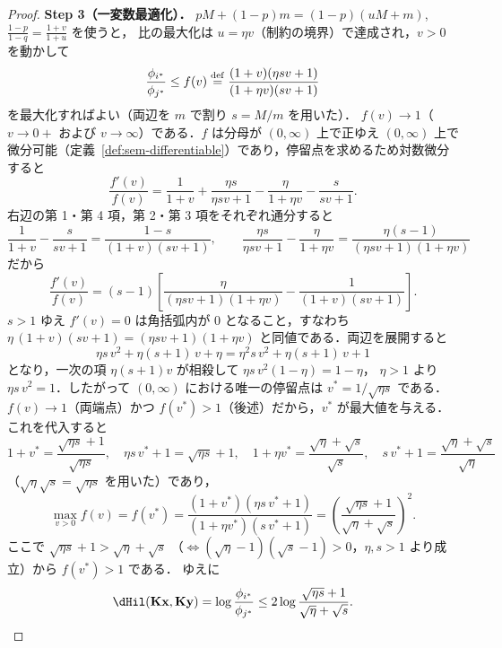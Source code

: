 \begin{proof}
  \textbf{Step 3（一変数最適化）．}
  $p M + (1-p)m = (1-p)(uM + m)$, $\frac{1-p}{1-q} = \frac{1+v}{1+u}$ を使うと，
  比の最大化は $u = \eta v$（制約の境界）で達成され，$v > 0$ を動かして
  \[
    \frac{\phi_{i^*}}{\phi_{j^*}}
    \leq f(v) \overset{\mathrm{def}}{=} \frac{(1+v)(\eta s v + 1)}{(1+\eta v)(s v + 1)}
  \]
  を最大化すればよい（両辺を $m$ で割り $s = M/m$ を用いた）．
  $f(v) \to 1$（$v \to 0+$ および $v \to \infty$）である．$f$ は分母が $(0,\infty)$ 上で正ゆえ
  $(0,\infty)$ 上で微分可能（定義~\ref{def:sem-differentiable}）であり，停留点を求めるため対数微分すると
  \[
    \frac{f'(v)}{f(v)}
    = \frac{1}{1+v} + \frac{\eta s}{\eta s v + 1}
      - \frac{\eta}{1+\eta v} - \frac{s}{s v + 1}.
  \]
  右辺の第 1・第 4 項，第 2・第 3 項をそれぞれ通分すると
  \[
    \frac{1}{1+v} - \frac{s}{s v + 1}
    = \frac{1-s}{(1+v)(s v + 1)},
    \qquad
    \frac{\eta s}{\eta s v + 1} - \frac{\eta}{1+\eta v}
    = \frac{\eta(s-1)}{(\eta s v + 1)(1+\eta v)}
  \]
  だから
  \[
    \frac{f'(v)}{f(v)}
    = (s-1)\left[
        \frac{\eta}{(\eta s v + 1)(1+\eta v)}
        - \frac{1}{(1+v)(s v + 1)}
      \right].
  \]
  $s > 1$ ゆえ $f'(v) = 0$ は角括弧内が $0$ となること，すなわち
  $\eta\,(1+v)(s v + 1) = (\eta s v + 1)(1+\eta v)$ と同値である．両辺を展開すると
  \[
    \eta s\,v^2 + \eta(s+1)\,v + \eta
    = \eta^2 s\,v^2 + \eta(s+1)\,v + 1
  \]
  となり，一次の項 $\eta(s+1)v$ が相殺して $\eta s\,v^2 (1-\eta) = 1 - \eta$，
  $\eta > 1$ より $\eta s\,v^2 = 1$．したがって $(0,\infty)$ における唯一の停留点は
  $v^* = 1/\sqrt{\eta s}$ である．$f(v) \to 1$（両端点）かつ
  $f(v^*) > 1$（後述）だから，$v^*$ が最大値を与える．これを代入すると
  \[
    1 + v^* = \frac{\sqrt{\eta s}+1}{\sqrt{\eta s}},\quad
    \eta s\,v^* + 1 = \sqrt{\eta s}+1,\quad
    1 + \eta v^* = \frac{\sqrt{\eta}+\sqrt{s}}{\sqrt{s}},\quad
    s\,v^* + 1 = \frac{\sqrt{\eta}+\sqrt{s}}{\sqrt{\eta}}
  \]
  （$\sqrt{\eta}\sqrt{s} = \sqrt{\eta s}$ を用いた）であり，
  \[
    \max_{v>0} f(v) = f(v^*)
    = \frac{(1+v^*)(\eta s\,v^* + 1)}{(1+\eta v^*)(s\,v^* + 1)}
    = \left(\frac{\sqrt{\eta s} + 1}{\sqrt{\eta} + \sqrt{s}}\right)^{\!2}.
  \]
  ここで $\sqrt{\eta s} + 1 > \sqrt{\eta} + \sqrt{s}$
  （$\iff (\sqrt{\eta}-1)(\sqrt{s}-1) > 0$，$\eta, s > 1$ より成立）から
  $f(v^*) > 1$ である．
  ゆえに
  \[
    \dHil(\mathbf{K}\mathbf{x}, \mathbf{K}\mathbf{y})
    = \log\frac{\phi_{i^*}}{\phi_{j^*}}
    \leq 2\log\frac{\sqrt{\eta s} + 1}{\sqrt{\eta} + \sqrt{s}}.
  \]


\end{proof}
